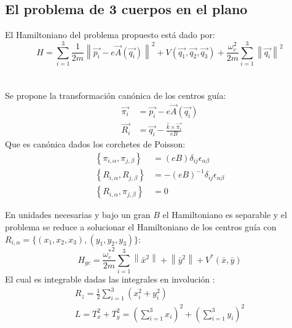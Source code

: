 \documentclass[xcolor=dvipsnames]{beamer}
\newcommand{\norm}[1]{\left\lVert #1 \right\rVert}
\newcommand{\roundP}[1]{\left( #1 \right)}
\newcommand{\poisson}[2]{\left\lbrace #1, #2 \right\rbrace}
\begin{document}
\subsection{El problema de 3 cuerpos en el plano}
\begin{frame}
El Hamiltoniano del problema propuesto está dado por:
\begin{equation*}
H = \sum_{i=1}^{3} \frac{1}{2m} \norm{ \vec{p_i} - 
e\vec{ A } \left( \vec{q_i} \right)}^2
+ V \roundP{ \vec{q_1},\vec{q_2},\vec{q_3} }
+\frac{\omega_c^2}{2m}\sum_{i=1}^{3} \norm{\vec{q_i}}^2
\end{equation*}
\\~\\
Se propone la transformación canónica de los centros guía:
\begin{align*}
\vec{\pi_i} &= \vec{p_i} - e\vec{A}\roundP{\vec{q_i}}\\
\vec{R_i} &= \vec{q_i} - \frac{\hat{k}\times\vec{\pi_i}}{eB}
\end{align*}
Que es canónica dados los corchetes de Poisson:
\begin{align*}
\poisson{\pi_{i,\alpha}}{\pi_{j,\beta}}&=\roundP{eB}\delta_{ij}\epsilon_{\alpha \beta}\\  
\poisson{R_{i,\alpha}}{R_{j,\beta}}&= -\roundP{eB}^{-1} \delta_{ij}\epsilon_{\alpha \beta}\\  
\poisson{R_{i,\alpha}}{\pi_{j,\beta}}&=0
\end{align*}
\end{frame}
\begin{frame}
En unidades necesarias y bajo un gran $B$ el Hamiltoniano es separable y el problema se reduce a solucionar el Hamiltoniano de los centros guía con $R_{i,\alpha} = \{(x_1,x_2,x_3),(y_1,y_2,y_3)\}$:
\begin{equation*}
H_{gc} = \frac{{\omega_c^*}^2}{2m} \sum_{i=1}^{3} \norm{\bar{x}^2} + \norm{\bar{y}^2}
+ V^*\roundP{\bar{x},\bar{y}}
\end{equation*}
El cual es integrable dadas las integrales en involución \cite{scheck}:
\begin{align*}
R_z = \frac{1}{2} \sum_{i=1}^{3} \roundP{x_i^2 + y_i^2}\\
L = T_x^2 + T_y^2 = \roundP{\sum_{i=1}^{3} x_i}^2 + \roundP{\sum_{i=1}^{3} y_i}^2\\
\end{align*}
\end{frame}
\end{document}
